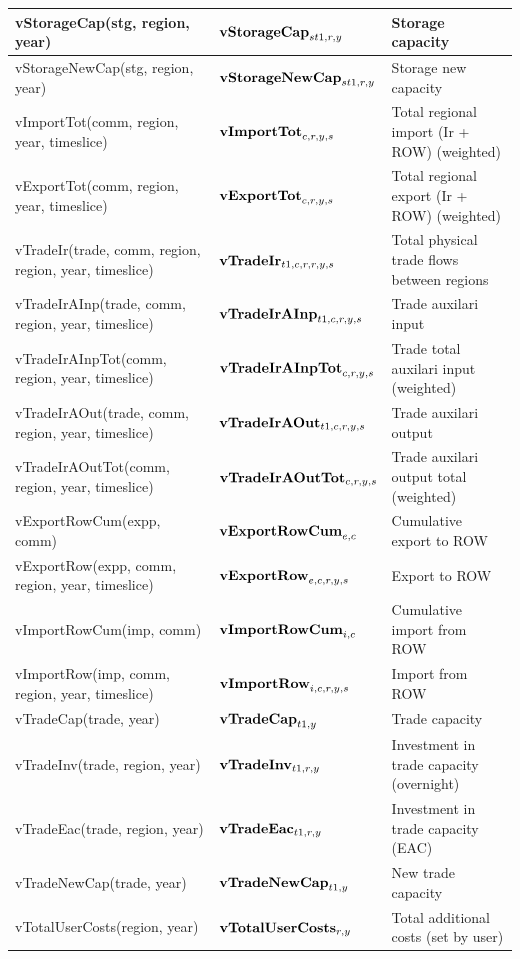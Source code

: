 \documentclass{article}
\begin{document}
\begin{longtable}{|p{10cm}|p{5cm}|p{9cm}|}
 \hline
vStorageCap(stg, region, year) & ${\bf vStorageCap}_{st1,r,y}$ & Storage capacity \\
 \hline
vStorageNewCap(stg, region, year) & ${\bf vStorageNewCap}_{st1,r,y}$ & Storage new capacity \\
 \hline
vImportTot(comm, region, year, timeslice) & ${\bf vImportTot}_{c,r,y,s}$ & Total regional import (Ir + ROW) (weighted) \\
 \hline
vExportTot(comm, region, year, timeslice) & ${\bf vExportTot}_{c,r,y,s}$ & Total regional export (Ir + ROW) (weighted) \\
 \hline
vTradeIr(trade, comm, region, region, year, timeslice) & ${\bf vTradeIr}_{t1,c,r,r,y,s}$ & Total physical trade flows between regions \\
 \hline
vTradeIrAInp(trade, comm, region, year, timeslice) & ${\bf vTradeIrAInp}_{t1,c,r,y,s}$ & Trade auxilari input \\
 \hline
vTradeIrAInpTot(comm, region, year, timeslice) & ${\bf vTradeIrAInpTot}_{c,r,y,s}$ & Trade total auxilari input (weighted) \\
 \hline
vTradeIrAOut(trade, comm, region, year, timeslice) & ${\bf vTradeIrAOut}_{t1,c,r,y,s}$ & Trade auxilari output \\
 \hline
vTradeIrAOutTot(comm, region, year, timeslice) & ${\bf vTradeIrAOutTot}_{c,r,y,s}$ & Trade auxilari output total (weighted) \\
 \hline
vExportRowCum(expp, comm) & ${\bf vExportRowCum}_{e,c}$ & Cumulative export to ROW \\
 \hline
vExportRow(expp, comm, region, year, timeslice) & ${\bf vExportRow}_{e,c,r,y,s}$ & Export to ROW \\
 \hline
vImportRowCum(imp, comm) & ${\bf vImportRowCum}_{i,c}$ & Cumulative import from ROW \\
 \hline
vImportRow(imp, comm, region, year, timeslice) & ${\bf vImportRow}_{i,c,r,y,s}$ & Import from ROW \\
 \hline
vTradeCap(trade, year) & ${\bf vTradeCap}_{t1,y}$ & Trade capacity \\
 \hline
vTradeInv(trade, region, year) & ${\bf vTradeInv}_{t1,r,y}$ & Investment in trade capacity (overnight) \\
 \hline
vTradeEac(trade, region, year) & ${\bf vTradeEac}_{t1,r,y}$ & Investment in trade capacity (EAC) \\
 \hline
vTradeNewCap(trade, year) & ${\bf vTradeNewCap}_{t1,y}$ & New trade capacity \\
 \hline
vTotalUserCosts(region, year) & ${\bf vTotalUserCosts}_{r,y}$ & Total additional costs (set by user) \\
 \hline
\end{longtable}
\end{document}
